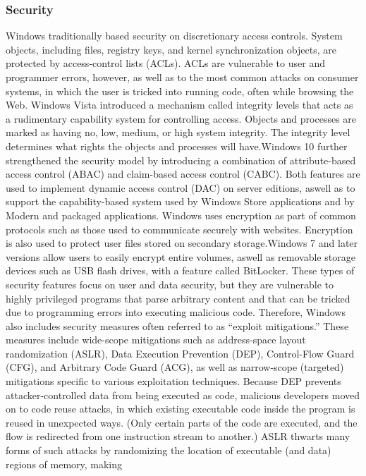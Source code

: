 \documentclass[12pt]{article}
\begin{document}
\subsubsection*{Security}
Windows traditionally based security on discretionary access controls. System
objects, including files, registry keys, and kernel synchronization objects,
are protected by access-control lists (ACLs). ACLs are vulnerable
to user and programmer errors, however, as well as to the most common
attacks on consumer systems, in which the user is tricked into running
code, often while browsing the Web. Windows Vista introduced a mechanism
called integrity levels that acts as a rudimentary capability system for controlling
access. Objects and processes are marked as having no, low, medium,
or high system integrity. The integrity level determines what rights the objects
and processes will have.Windows 10 further strengthened the security model by introducing a
combination of attribute-based access control (ABAC) and claim-based access
control (CABC). Both features are used to implement dynamic access control
(DAC) on server editions, aswell as to support the capability-based system used
by Windows Store applications and by Modern and packaged applications.
Windows uses encryption as part of common protocols such as those used
to communicate securely with websites. Encryption is also used to protect user
files stored on secondary storage.Windows 7 and later versions allow users to easily encrypt entire volumes, aswell as removable storage devices such as USB
flash drives, with a feature called BitLocker. These types of security features focus on user and data security, but they
are vulnerable to highly privileged programs that parse arbitrary content
and that can be tricked due to programming errors into executing malicious
code. Therefore, Windows also includes security measures often referred to
as “exploit mitigations.” These measures include wide-scope mitigations such
as address-space layout randomization (ASLR), Data Execution Prevention
(DEP), Control-Flow Guard (CFG), and Arbitrary Code Guard (ACG), as well as
narrow-scope (targeted) mitigations specific to various exploitation techniques.
Because DEP prevents attacker-controlled data from being executed as
code, malicious developers moved on to code reuse attacks, in which existing
executable code inside the program is reused in unexpected ways. (Only
certain parts of the code are executed, and the flow is redirected from one
instruction stream to another.) ASLR thwarts many forms of such attacks by
randomizing the location of executable (and data) regions of memory, making
\end{document}
